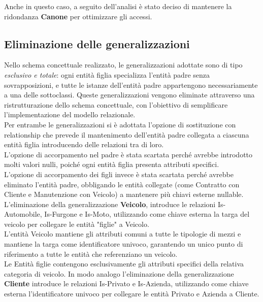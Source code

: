 \documentclass[10pt,a4paper]{article}
\begin{document}
\noindent
Anche in questo caso, a seguito dell’analisi è stato deciso di mantenere la ridondanza \textbf{Canone} per ottimizzare gli accessi.\\


\subsection{Eliminazione delle generalizzazioni}
Nello schema concettuale realizzato, le generalizzazioni adottate sono di tipo \textit{esclusivo e totale}: ogni entità figlia specializza l'entità padre senza sovrapposizioni, e tutte le istanze dell'entità padre appartengono necessariamente a una delle sottoclassi.
\noindent
Queste generalizzazioni vengono eliminate attraverso una ristrutturazione dello schema concettuale, con l'obiettivo di semplificare l'implementazione del modello relazionale.\\
\noindent
Per entrambe le generalizzazioni si è adottata l'opzione di sostituzione con relationship che prevede il mantenimento dell'entità padre collegata a ciascuna entità figlia introducendo delle relazioni tra di loro.\\
L'opzione di accorpamento nel padre è stata scartata perché avrebbe introdotto molti valori nulli, poiché ogni entità figlia presenta attributi specifici.\\
L'opzione di accorpamento dei figli invece è stata scartata perché avrebbe eliminato l'entità padre, obbligando le entità collegate (come Contratto con Cliente e Manutenzione con Veicolo) a mantenere più chiavi esterne nullable.
\noindent
L'eliminazione della generalizzazione \textbf{Veicolo}, introduce le relazioni Is-Automobile, Is-Furgone e Is-Moto,  utilizzando come chiave esterna la targa del veicolo per collegare le entità "figlie" a Veicolo.\\
L'entità Veicolo mantiene gli attributi comuni a tutte le tipologie di mezzi e mantiene la targa come identificatore univoco, garantendo un unico punto di riferimento a tutte le entità che referenziano un veicolo.\\
Le Entità figlie contengono esclusivamente gli attributi specifici della relativa categoria di veicolo.
\noindent
In modo analogo l'eliminazione della generalizzazione \textbf{Cliente} introduce le relazioni Is-Privato e Is-Azienda, utilizzando come chiave esterna l'identificatore univoco per collegare le entità Privato e Azienda a Cliente.
\end{document}
